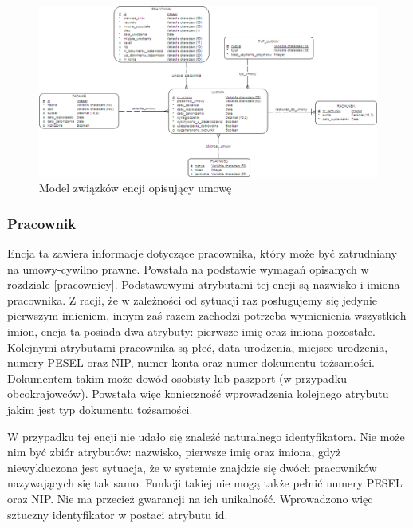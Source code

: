 \begin{figure}[]
    \begin{center}
	\includegraphics[scale=.8,angle=-90]{img/logiczny3.png}
	\caption{Model związków encji opisujący umowę}
	\label{logiczny3}
    \end{center}
\end{figure}

\subsubsection{Pracownik}
Encja ta zawiera informacje dotyczące pracownika, który może być zatrudniany na umowy-cywilno prawne. Powstała na podstawie wymagań opisanych w rozdziale \ref{pracownicy}. Podstawowymi atrybutami tej encji są nazwisko i imiona pracownika. Z racji, że w zależności od sytuacji raz posługujemy się jedynie pierwszym imieniem, innym zaś razem zachodzi potrzeba wymienienia wszystkich imion, encja ta posiada dwa atrybuty: pierwsze imię oraz imiona pozostałe. Kolejnymi atrybutami pracownika są płeć, data urodzenia, miejsce urodzenia, numery PESEL oraz NIP, numer konta oraz numer dokumentu tożsamości. Dokumentem takim może dowód osobisty lub paszport  (w przypadku obcokrajowców). Powstała więc konieczność wprowadzenia kolejnego atrybutu jakim jest typ dokumentu tożsamości.

W przypadku tej encji nie udało się znaleźć naturalnego identyfikatora. Nie może nim być zbiór atrybutów: nazwisko, pierwsze imię oraz imiona, gdyż niewykluczona jest sytuacja, że w systemie znajdzie się dwóch pracowników nazywających się tak samo. Funkcji takiej nie mogą także pełnić numery PESEL oraz NIP. Nie ma przecież gwarancji na ich unikalność. Wprowadzono więc sztuczny identyfikator w postaci atrybutu id.

